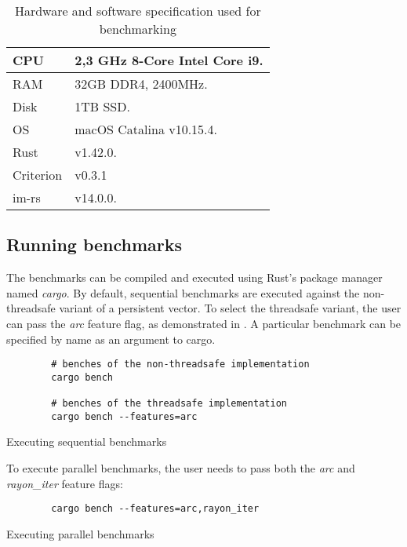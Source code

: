 \begin{table}[!htbp]
    \centering

    \begin{tabular} { |l| p{11cm} | }
        \hline CPU & 2,3 GHz 8-Core Intel Core i9. \\ \hline
        RAM & 32GB DDR4, 2400MHz. \\ \hline
        Disk & 1TB SSD. \\ \hline
        OS & macOS Catalina v10.15.4. \\ \hline
        Rust & v1.42.0. \\ \hline
        Criterion & v0.3.1 \\ \hline
        im-rs & v14.0.0. \\ \hline
    \end{tabular}

    \label{tab:exec-environment}
    \caption{Hardware and software specification used for benchmarking}
\end{table}

\subsection{Running benchmarks}
The benchmarks can be compiled and executed using Rust's package manager named \emph{cargo}. By default, sequential benchmarks are executed against the non-threadsafe variant of a persistent vector. To select the threadsafe variant, the user can pass the \emph{arc} feature flag, as demonstrated in . A particular benchmark can be specified by name as an argument to cargo.

\begin{listing}[!htbp]

    \centering
    \begin{verbatim}
        # benches of the non-threadsafe implementation
        cargo bench

        # benches of the threadsafe implementation
        cargo bench --features=arc
    \end{verbatim}

    \caption{Executing sequential benchmarks}
    \label{lst:sequential-benches}
\end{listing}

To execute parallel benchmarks, the user needs to pass both the \emph{arc} and \emph{rayon\_iter} feature flags:
\begin{listing}[!htbp]

    \centering
    \begin{verbatim}
        cargo bench --features=arc,rayon_iter
    \end{verbatim}

    \caption{Executing parallel benchmarks}
    \label{lst:parallel-benches}
\end{listing}

